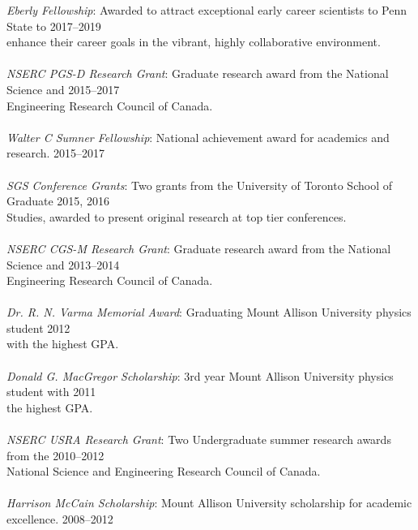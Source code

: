 \documentclass[10pt]{res} %
\begin{document}
\begin{resume}
\vspace{8pt} %
{\sl Eberly Fellowship}: Awarded to attract exceptional early career scientists to Penn State to \hfill 2017--2019 \\
enhance their career goals in the vibrant, highly collaborative environment.\\ \\
{\sl NSERC PGS-D Research Grant}: Graduate research award from the National Science and \hfill 2015--2017 \\
Engineering Research Council of Canada.\\ \\
{\sl Walter C Sumner Fellowship}: National achievement award for academics and research. \hfill 2015--2017 \\ \\
{\sl SGS Conference Grants}: Two grants from the University of Toronto School of Graduate \hfill 2015, 2016 \\
Studies, awarded to present original research at top tier conferences. \\ \\
{\sl NSERC CGS-M Research Grant}: Graduate research award from the National Science and \hfill 2013--2014 \\
Engineering Research Council of Canada.\\ \\
{\sl Dr. R. N. Varma Memorial Award}: Graduating Mount Allison University physics student \hfill 2012 \\
with the highest GPA. \\ \\
{\sl Donald G. MacGregor Scholarship}: 3rd year Mount Allison University physics student with \hfill 2011 \\ 
the highest GPA. \\ \\
{\sl NSERC USRA Research Grant}: Two Undergraduate summer research awards from the  \hfill 2010--2012 \\
National Science and Engineering Research Council of Canada.\\ \\
{\sl Harrison McCain Scholarship}: Mount Allison University scholarship for academic excellence. \hfill 2008--2012 \\

 
\vspace{0.2in} %


\end{resume}
\end{document}
